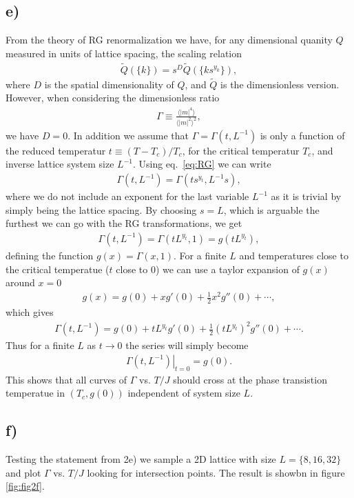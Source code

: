 \documentclass[reprint, amsmath, amssymb, aps, onecolumn]{revtex4-2}
\begin{document}
{{\subsection*{e)}
\noindent From the theory of RG renormalization we have, for any dimensional quanity $Q$ measured in units of lattice spacing, the scaling relation
\begin{align}
  \tilde{Q}(\{k\}) = s^D \tilde{Q}(\{ks^{y_k}\}),
  \label{eq:RG}
\end{align}
where $D$ is the spatial dimensionality of $Q$, and $\tilde{Q}$ is the dimensionless version. However, when considering the dimensionless ratio
\begin{align*}
  \Gamma \equiv \frac{\langle |m|^4 \rangle}{\langle |m|^2 \rangle^2 },
\end{align*}
we have $D =0$. In addition we assume that $\Gamma = \Gamma(t, L^{-1})$ is only a function of the reduced temperatur $t \equiv (T-T_c)/T_c$, for the critical temperatur $T_c$, and inverse lattice system size $L^{-1}$. Using eq.~\ref{eq:RG} we can write
\begin{align*}
  \Gamma(t,L^{-1}) = \Gamma(ts^{y_t},L^{-1}s),
\end{align*}
where we do not include an exponent for the last variable $L^{-1}$ as it is trivial by simply being the lattice spacing. By choosing $s = L$, which is arguable the furthest we can go with the RG transformations, we get 
\begin{align*}
  \Gamma(t,L^{-1}) = \Gamma(tL^{y_t}, 1) = g(tL^{y_t}),
\end{align*}
defining the function $g(x) = \Gamma(x, 1)$. For a finite $L$ and temperatures close to the critical temperatue ($t$ close to 0) we can use a taylor expansion of $g(x)$ around $x=0$
\begin{align*}
  g(x) = g(0) + xg'(0) + \frac{1}{2}x^2 g''(0) + \cdots,
\end{align*}  
which gives 
\begin{align*}
  \Gamma(t,L^{-1}) = g(0) + tL^{y_t}g'(0) + \frac{1}{2}(tL^{y_t})^2g''(0) + \cdots.
\end{align*}
Thus for a finite $L$ as $t \to 0$ the series will simply become
\begin{align}
 \left. \Gamma(t,L^{-1}) \right|_{t=0} = g(0).
 \label{eq:intersec}
\end{align}
This shows that all curves of $\Gamma$ vs. $T/J$ should cross at the phase transistion temperatue in $(T_c, g(0))$ independent of system size $L$.


\subsection*{f)}
\noindent Testing the statement from 2e) we sample a 2D lattice with size $L = \{8, 16, 32\}$ and plot $\Gamma$ vs. $T/J$ looking for intersection points. 
The result is showbn in figure \ref{fig:fig2f}.

}}
\end{document}
